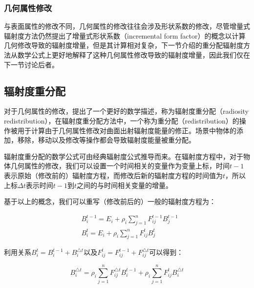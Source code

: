 \subsubsection{几何属性修改}
与表面属性的修改不同，几何属性的修改往往会涉及形状系数的修改，尽管增量式辐射度方法仍然提出了增量式形状系数（incremental form factor）的概念以计算几何修改导致的辐射度增量，但是其计算相对复杂，下一节介绍的重分配辐射度方法从数学公式上更好地解释了这种几何属性修改导致的辐射度增量，因此我们仅在下一节讨论后者。





\subsection{辐射度重分配}\label{sec:r-radiosity-redistribution}
对于几何属性的修改，\cite{a:RadiosityRedistributionforDynamicEnvironments}提出了一个更好的数学描述，称为辐射度重分配（radiosity redistribution），在辐射度重分配方法中，一个称为重分配（redistribution）的操作被用于计算由于几何属性修改对曲面出射辐射度能量的修正。场景中物体的添加，移除，移动以及修改等操作都会导致辐射度能量被重分配。

辐射度重分配的数学公式可由经典辐射度公式推导而来。在辐射度方程中，对于物体几何属性的修改，我们可以设置一个时间相关的变量作为变量上标，时间$t-1$表示原始（修改前的）辐射度方程，而修改后新的辐射度方程的时间值为$t$，所以上标$\Delta t$表示时间$t-1$到$t$之间的与时间相关变量的增量。

基于以上的概念，我们可以重写（修改前后的）一般的辐射度方程为：

\begin{equation}
	\begin{aligned}
		&B^{t-1}_i=E_i+\rho_i \sum^{n}_{j=1}F^{t-1}_{ij}B^{t-1}_j\\
		&B^{t}_i=E_i+\rho_i \sum^{n}_{j=1}F^{t}_{ij}B^{t}_j
	\end{aligned}
\end{equation}

\noindent 利用关系$B^{t}_i=B^{t-1}_i+B^{\triangle t}_i$以及$F^{t}_{ij}=F^{t-1}_{ij}+F^{\triangle t}_{ij}$可以得到：

\begin{equation}\label{e:r-difference-of-radiosity}
	B^{\triangle t}_i=\rho_i\sum^{n}_{j=1}F^{\triangle t}_{ij}B^{t-1}_i+\rho_i\sum^{n}_{j=1}F^{t}_{ij}B^{\triangle t}_i
\end{equation}


